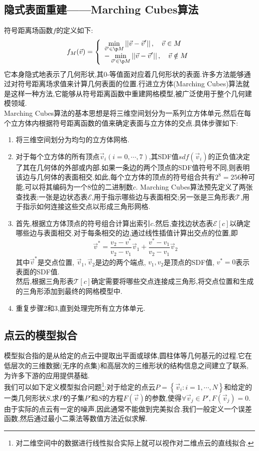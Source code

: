 \documentclass{ctexart}
\begin{document}
\subsection{隐式表面重建——Marching Cubes算法}
符号距离场函数$f$的定义如下:
\[f_M(\vec{v})=\left\{\begin{array}{l}
    \displaystyle\min_{\vec{v}'\in\p M}\left|\left|\vec{v}-\vec{v}'\right|\right|,\quad \vec{v}\in M\\
    \displaystyle-\min_{\vec{v}'\in\p M}\left|\left|\vec{v}-\vec{v}'\right|\right|,\quad \vec{v}\notin M
\end{array}\right.\]
它本身隐式地表示了几何形状,其0-等值面对应着几何形状的表面.许多方法能够通过对符号距离场求值来计算几何表面的位置.行进立方体(Marching Cubes)算法就是这样一种方法,它能够从符号距离函数中重建网格模型,被广泛使用于整个几何建模领域.\\
\indent Marching Cubes算法的基本思想是将三维空间划分为一系列立方体单元,然后在每个立方体内根据符号距离函数的值来确定表面与立方体的交点.具体步骤如下:
\begin{enumerate}[label=\tbf{\arabic*.},topsep=0pt,parsep=0pt,itemsep=0pt,partopsep=0pt]
    \item 将三维空间划分为均匀的立方体网格.
    \item 对于每个立方体的所有顶点$\vec{v}_i(i=0,\cdots,7)$,其SDF值$sdf\left(\vec{v}_i\right)$的正负值决定了其在几何体的外部或内部.如果一条边的两个顶点的SDF值符号不同,则表明该边与几何体的表面相交.如此,每个立方体的顶点的符号组合共有$2^8=256$种可能,可以将其编码为一个8位的二进制数$c$. Marching Cubes算法预先定义了两张查找表:一张是边状态表$\mathcal{E}$,用于指示哪些边与表面相交;另一张是三角形表$\mathcal{T}$,用于指示如何连接这些交点以形成三角形网格.
    \item 首先,根据立方体顶点的符号组合计算出索引$c$.然后,查找边状态表$\mathcal{E}[c]$以确定哪些边与表面相交.对于每条相交的边,通过线性插值计算出交点的位置,即
    \[\vec{v}^\ast=\dfrac{v_2-v^\ast}{v_2-v_1}\vec{v}_1+\dfrac{v^\ast-v_1}{v_2-v_1}\vec{v}_2\]
    其中$\vec{v}^\ast$是交点位置, $\vec{v}_1,\vec{v}_2$是边的两个端点, $v_1,v_2$是顶点的SDF值, $v^\ast=0$表示表面的SDF值.\\
    然后,根据三角形表$\mathcal{T}[c]$确定需要将哪些交点连接成三角形,将交点位置和生成的三角形添加到最终的网格模型中.
    \item 重复步骤2和3,直到处理完所有立方体单元.
\end{enumerate}
\subsection{点云的模型拟合}
模型拟合指的是从给定的点云中提取出平面或球体,圆柱体等几何基元的过程.它在低层次的三维数据(无序的点集)和高层次的三维形状的结构信息之间建立了联系,为许多下游的应用提供基础.\\
\indent 我们可以如下定义模型拟合问题\footnote{对二维空间中的数据进行线性拟合实际上就可以视作对二维点云的直线拟合.}:对于给定的点云$P=\left\{\vec{v}_i:i=1,\cdots,N\right\}$和给定的一类几何形状$S$,求$P$的子集$P'$和$S$的方程$F(\vec{v})$的参数,使得$\forall\vec{v}_j\in P',F\left(\vec{v}_j\right)=0$.由于实际的点云有一定的噪声,因此通常不能做到完美拟合.我们一般定义一个误差函数,然后通过最小二乘法等数值方法近似求解.
\end{document}
